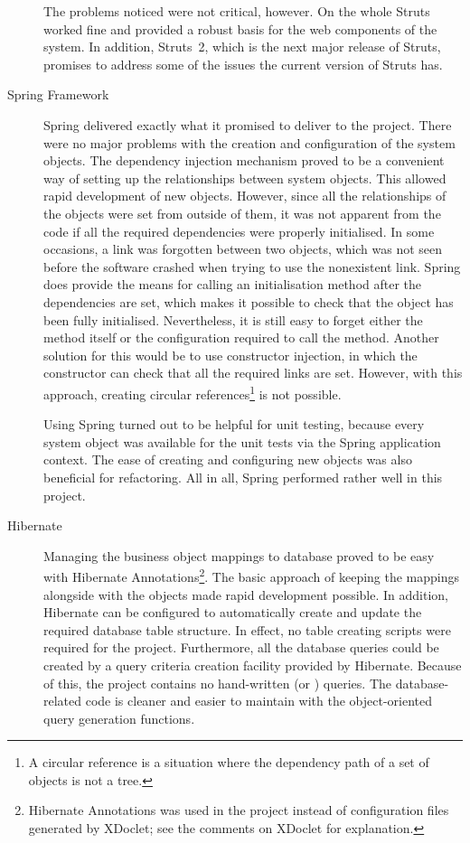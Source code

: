 \begin{description}
The problems noticed were not critical, however. On the whole Struts 
worked fine and provided a robust basis for the web components of the 
system. In addition, Struts~2, which is the next major release of 
Struts, promises to address some of the issues the current version of 
Struts has.

\item[Spring Framework] Spring delivered exactly what it promised to 
deliver to the project. There were no major problems with the creation 
and configuration of the system objects. The dependency injection 
mechanism proved to be a convenient way of setting up the 
relationships between system objects. This allowed rapid development 
of new objects. However, since all the relationships of the objects 
were set from outside of them, it was not apparent from the code if 
all the required dependencies were properly initialised. In some 
occasions, a link was forgotten between two objects, which was not 
seen before the software crashed when trying to use the nonexistent 
link. Spring does provide the means for calling an initialisation 
method after the dependencies are set, which makes it possible to 
check that the object has been fully initialised. Nevertheless, it is 
still easy to forget either the method itself or the configuration 
required to call the method. Another solution for this would be to use 
constructor injection, in which the constructor can check that all the 
required links are set. However, with this approach, creating circular 
references\footnote{A circular reference is a situation where the 
dependency path of a set of objects is not a tree.} is not possible.

Using Spring turned out to be helpful for unit testing, because every 
system object was available for the unit tests via the Spring 
application context. The ease of creating and configuring new objects 
was also beneficial for refactoring. All in all, Spring performed
rather well in this project.

\item[Hibernate] Managing the business object mappings to database 
proved to be easy with Hibernate Annotations\footnote{Hibernate 
Annotations was used in the project instead of configuration files 
generated by XDoclet; see the comments on XDoclet for explanation.}. 
The basic approach of keeping the mappings alongside with the objects 
made rapid development possible. In addition, Hibernate can be 
configured to automatically create and update the required database 
table structure. In effect, no  table creating scripts 
were required for the project. Furthermore, all the database queries 
could be created by a query criteria creation facility provided by 
Hibernate. Because of this, the project contains no hand-written 
 (or ) queries. The database-related code is 
cleaner and easier to maintain with the object-oriented query 
generation functions.


\end{description}
